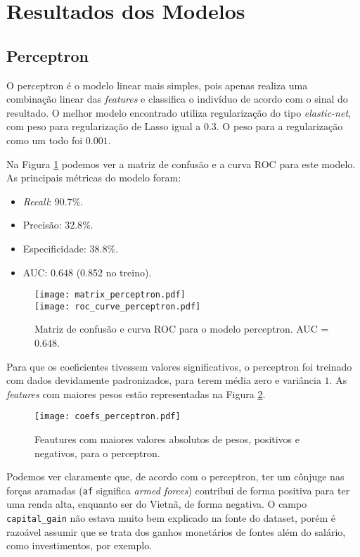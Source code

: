 \section{Resultados dos Modelos}

\subsection{Perceptron}

O perceptron é o modelo linear mais simples, pois apenas realiza uma combinação linear das \emph{features} e classifica o indivíduo de acordo com o sinal do resultado.
O melhor modelo encontrado utiliza regularização do tipo \emph{elastic-net}, com peso para regularização de Lasso igual a \( 0.3 \).
O peso para a regularização como um todo foi \( 0.001 \).

Na Figura \ref{perceptron metric} podemos ver a matriz de confusão e a curva ROC para este modelo.
As principais métricas do modelo foram:
\begin{itemize}
    \item \emph{Recall}: \( 90.7 \% \).
    \item Precisão: \( 32.8 \% \).
    \item Especificidade: \( 38.8 \% \).
    \item AUC: \( 0.648 \) (0.852 no treino).
\end{itemize}
\begin{figure}[htb]
    \begin{center}
        \texttt{[image: matrix\_perceptron.pdf]} \\
        \texttt{[image: roc\_curve\_perceptron.pdf]}
    \end{center}
    \caption{Matriz de confusão e curva ROC para o modelo perceptron. AUC = 0.648.}
    \label{perceptron metric}
\end{figure}

Para que os coeficientes tivessem valores significativos, o perceptron foi treinado com dados devidamente padronizados, para terem média zero e variância \( 1 \).
As \emph{features} com maiores pesos estão representadas na Figura \ref{perceptron feature}.
\begin{figure}[htb]
    \begin{center}
        \texttt{[image: coefs\_perceptron.pdf]}
    \end{center}
    \caption{Feautures com maiores valores absolutos de pesos, positivos e negativos, para o perceptron.}
    \label{perceptron feature}
\end{figure}
Podemos ver claramente que, de acordo com o perceptron, ter um cônjuge nas forças aramadas (\verb|af| significa \emph{armed forces}) contribui de forma positiva para ter uma renda alta, enquanto ser do Vietnã, de forma negativa.
O campo \verb|capital_gain| não estava muito bem explicado na fonte do dataset, porém é razoável assumir que se trata dos ganhos monetários de fontes além do salário, como investimentos, por exemplo.

